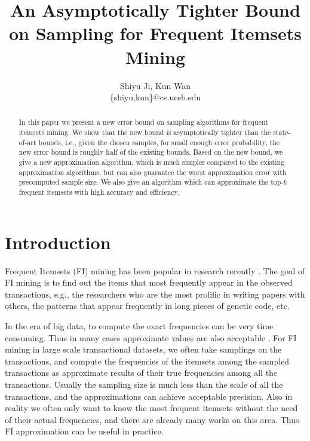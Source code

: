\documentclass{article}
\begin{document}
\title{\Large\bf An Asymptotically Tighter Bound on Sampling for Frequent Itemsets Mining}
\author{Shiyu Ji, Kun Wan\\ \{shiyu,kun\}@cs.ucsb.edu}
\date{}
\maketitle

\newtheorem{definition}{Definition}
\theoremstyle{definition}
\newtheorem{theorem}{Theorem}
\theoremstyle{plain}
\newtheorem{lemma}{Lemma}
\theoremstyle{plain}
\newtheorem{corollary}{Corollary}
\theoremstyle{plain}

\begin{abstract}
In this paper we present a new error bound on sampling algorithms for frequent itemsets mining. We show that the new bound is asymptotically tighter than the state-of-art bounds, i.e., given the chosen samples, for small enough error probability, the new error bound is roughly half of the existing bounds. Based on the new bound, we give a new approximation algorithm, which is much simpler compared to the existing approximation algorithms, but can also guarantee the worst approximation error with precomputed sample size. We also give an algorithm which can approximate the top-$k$ frequent itemsets with high accuracy and efficiency.
\end{abstract}

\section{Introduction}
Frequent Itemsets (FI) mining has been popular in research recently \cite{AIS93, HCX07, RU15}. The goal of FI mining is to find out the items that most frequently appear in the observed transactions, e.g., the researchers who are the most prolific in writing papers with others, the patterns that appear frequently in long pieces of genetic code, etc. 

In the era of big data, to compute the exact frequencies can be very time consuming. Thus in many cases approximate values are also acceptable \cite{AIS93,PCY95,FSG99,HCX07,LRU14,RU15}.
For FI mining in large scale transactional datasets, we often take samplings on the transactions, and compute the frequencies of the itemsets among the sampled transactions as approximate results of their true frequencies among all the transactions. Usually the sampling size is much less than the scale of all the transactions, and the approximations can achieve acceptable precision. Also in reality we often only want to know the most frequent itemsets without the need of their actual frequencies, and there are already many works \cite{AIS93,PCY95,FSG99,HCX07,LRU14} on this area. Thus FI approximation can be useful in practice.
\end{document}
